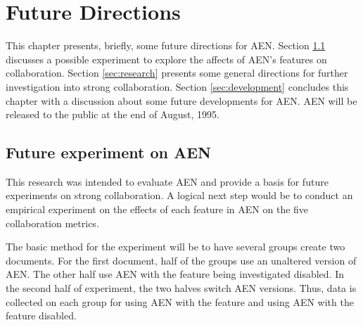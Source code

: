 

\chapter{Future Directions}
\label{sec:future}

This chapter presents, briefly, some future directions for AEN.  Section
\ref{sec:exp} discusses a possible experiment to explore the affects of
AEN's features on collaboration.  Section \ref{sec:research} presents some
general directions for further investigation into strong collaboration.
Section \ref{sec:development} concludes this chapter with a discussion
about some future developments for AEN.  AEN will be released to the public
at the end of August, 1995.



\section{Future experiment on AEN}
\label{sec:exp}

This research was intended to evaluate AEN and provide a basis for future
experiments on strong collaboration.  A logical next step would be to
conduct an empirical experiment on the effects of each feature in AEN on
the five collaboration metrics.


The basic method for the experiment will be to have several groups create
two documents.  For the first document, half of the groups use an unaltered
version of AEN.  The other half use AEN with the feature being investigated
disabled.  In the second half of experiment, the two halves switch AEN
versions.  Thus, data is collected on each group for using AEN with the
feature and using AEN with the feature disabled.

